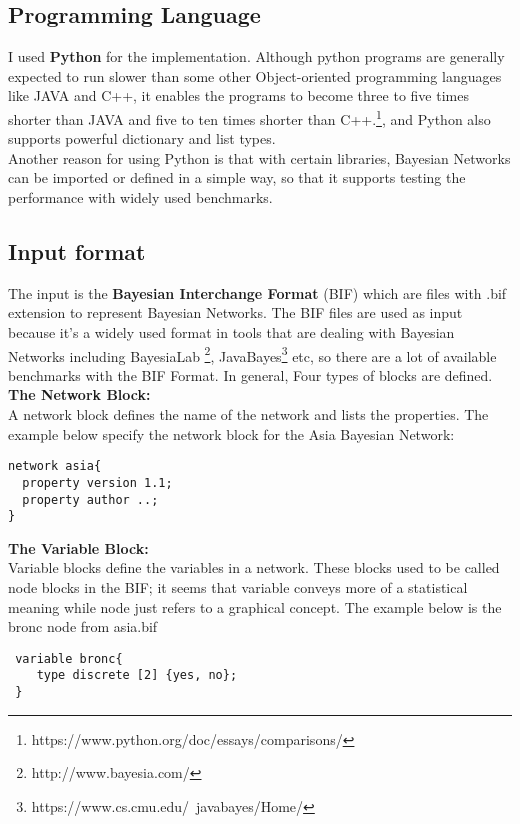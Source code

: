 \subsection{Programming Language}
I used \textbf{Python} for the implementation. Although python programs are generally expected to run slower than some other Object-oriented programming languages like JAVA and C++, it enables the programs to become three to five times shorter than JAVA and five to ten times shorter than C++.\footnote{https://www.python.org/doc/essays/comparisons/}, 
and Python also supports powerful dictionary and list types. \\

\noindent Another reason for using Python is that with certain libraries, Bayesian Networks can be imported or defined in a simple way, so that it supports testing the performance with widely used benchmarks.

\subsection{Input format}
The input is the \textbf{Bayesian Interchange Format} (BIF) which are files with .bif extension to represent Bayesian Networks. The BIF files are used as input because it's a widely used format in tools that are dealing with Bayesian Networks including BayesiaLab \footnote{http://www.bayesia.com/}, JavaBayes\footnote{https://www.cs.cmu.edu/~javabayes/Home/} etc, so there are a lot of available benchmarks with the BIF Format. In general, Four types of blocks are defined.\\

\noindent \textbf{The Network Block:}\\
\noindent A network block defines the name of the network and lists the properties. The example below specify the network block for the Asia Bayesian Network:
\begin{lstlisting}
network asia{
  property version 1.1;
  property author ..;
}
\end{lstlisting}

\noindent \textbf{The Variable Block:}\\
Variable blocks define the variables in a network. These blocks used
to be called node blocks in the BIF; it seems that variable conveys
more of a statistical meaning while node just refers to a graphical
concept. The example below is the bronc node from asia.bif
\begin{lstlisting}
 variable bronc{
    type discrete [2] {yes, no};
 }
\end{lstlisting}

